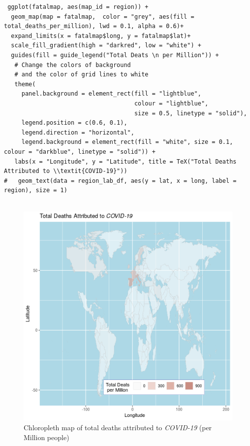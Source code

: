 \documentclass[11pt]{article}
\begin{document}
\begin{listing}[htbp]
\begin{verbatim}
 ggplot(fatalmap, aes(map_id = region)) +
  geom_map(map = fatalmap,  color = "grey", aes(fill = total_deaths_per_million), lwd = 0.1, alpha = 0.6)+
  expand_limits(x = fatalmap$long, y = fatalmap$lat)+
  scale_fill_gradient(high = "darkred", low = "white") +
  guides(fill = guide_legend("Total Deats \n per Million")) +
   # Change the colors of background
   # and the color of grid lines to white
   theme(
     panel.background = element_rect(fill = "lightblue",
                                     colour = "lightblue",
                                     size = 0.5, linetype = "solid"),
     legend.position = c(0.6, 0.1),
     legend.direction = "horizontal",
     legend.background = element_rect(fill = "white", size = 0.1, colour = "darkblue", linetype = "solid")) +
   labs(x = "Longitude", y = "Latitude", title = TeX("Total Deaths Attributed to \\textit{COVID-19}"))
#   geom_text(data = region_lab_df, aes(y = lat, x = long, label = region), size = 1)


\end{verbatim}
\caption{\label{orgf44bd0b}use \texttt{ggplot2} to create a chloropleth map from data, output in figure \ref{fig:org186877f}}
\end{listing}


\begin{figure}[htbp]
\centering
\includegraphics[width=.9\linewidth]{FirstChALL.png}
\caption{\label{fig:org186877f}Chloropleth map of total deaths attributed to \emph{COVID-19} (per Million people)}
\end{figure}
\end{document}
